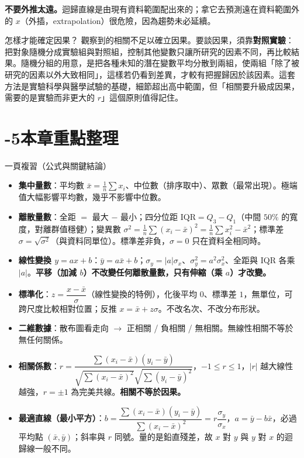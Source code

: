 \documentclass[11pt]{article}
\begin{document}
\textbf{不要外推太遠。}迴歸直線是由現有資料範圍配出來的；拿它去預測遠在資料範圍外的 $x$（外插，extrapolation）很危險，因為趨勢未必延續。

\begin{延伸框}{怎樣才能確定因果？}
觀察到的相關不足以確立因果。要談因果，須靠\textbf{對照實驗}：把對象隨機分成實驗組與對照組，控制其他變數只讓所研究的因素不同，再比較結果。隨機分組的用意，是把各種未知的潛在變數平均分散到兩組，使兩組「除了被研究的因素以外大致相同」，這樣若仍看到差異，才較有把握歸因於該因素。這套方法是實驗科學與醫學試驗的基礎，細節超出高中範圍，但「相關要升級成因果，需要的是實驗而非更大的 $r$」這個原則值得記住。
\end{延伸框}

\section*{-5\quad 本章重點整理}

\begin{補充框}{一頁複習（公式與關鍵結論）}
\begin{itemize}\setlength{\itemsep}{2pt}
\item \textbf{集中量數}：平均數 $\bar x=\frac1n\sum x_i$、中位數（排序取中）、眾數（最常出現）。極端值大幅影響平均數，幾乎不影響中位數。
\item \textbf{離散量數}：全距 $=$ 最大 $-$ 最小；四分位距 $\text{IQR}=Q_3-Q_1$（中間 $50\%$ 的寬度，對離群值穩健）；變異數 $\sigma^2=\frac1n\sum (x_i-\bar x)^2=\frac1n\sum x_i^2-\bar x^2$；標準差 $\sigma=\sqrt{\sigma^2}$（與資料同單位）。標準差非負，$\sigma=0$ 只在資料全相同時。
\item \textbf{線性變換 $y=ax+b$}：$\bar y=a\bar x+b$；$\sigma_y=\lvert a\rvert\sigma_x$、$\sigma_y^2=a^2\sigma_x^2$、全距與 IQR 各乘 $\lvert a\rvert$。\textbf{平移（加減 $b$）不改變任何離散量數，只有伸縮（乘 $a$）才改變。}
\item \textbf{標準化}：$z=\dfrac{x-\bar x}{\sigma}$（線性變換的特例），化後平均 $0$、標準差 $1$，無單位，可跨尺度比較相對位置；反推 $x=\bar x+z\sigma$。不改名次、不改分布形狀。
\item \textbf{二維數據}：散布圖看走向 $\rightarrow$ 正相關 / 負相關 / 無相關。無線性相關不等於無任何關係。
\item \textbf{相關係數}：$r=\dfrac{\sum(x_i-\bar x)(y_i-\bar y)}{\sqrt{\sum(x_i-\bar x)^2}\sqrt{\sum(y_i-\bar y)^2}}$，$-1\le r\le1$，$|r|$ 越大線性越強，$r=\pm1$ 為完美共線。\textbf{相關不等於因果。}
\item \textbf{最適直線（最小平方）}：$b=\dfrac{\sum(x_i-\bar x)(y_i-\bar y)}{\sum(x_i-\bar x)^2}=r\dfrac{\sigma_y}{\sigma_x}$，$a=\bar y-b\bar x$，必過平均點 $(\bar x,\bar y)$；斜率與 $r$ 同號。量的是鉛直殘差，故 $x$ 對 $y$ 與 $y$ 對 $x$ 的迴歸線一般不同。
\end{itemize}
\end{補充框}
\end{document}
